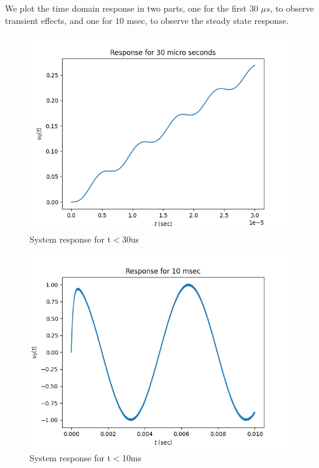 \documentclass{article}
\begin{document}
We plot the time domain response in two parts, one for the first 30
\(\mu s\), to observe transient effects, and one for \(10\) msec, to
observe the steady state response.

\begin{figure}[tbh!]
\includegraphics[scale=0.6]{plots/Response for 30 micro seconds.png}
\centering
\caption{System response for t$<$30us}
\label{fig:System response for t<30us}
\end{figure}
\clearpage
\begin{figure}[tbh!]
\includegraphics[scale=0.6]{plots/Response for 10 msec.png}
\centering
\caption{System response for t$<$10ms}
\label{fig:System response for t<10ms}
\end{figure}
\end{document}

